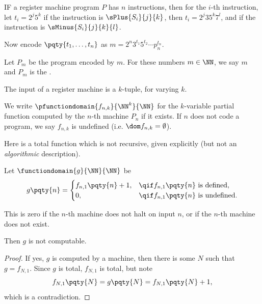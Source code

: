 \begin{definition}
    \label{def:encoding-register-machines}%
    IF a register machine program \(P\) has \(n\) instructions, then for the \(i\)-th instruction, let \(t_i = 2^j 5^k\) if the instruction is \(\sPlus{S_i}{j}{k}\), then \(t_i = 2^j 3 5^k 7^l\), and if the instruction is \(\sMinus{S_i}{j}{k}{l}\).

    Now encode \(\pqty{t_1, \ldots, t_n}\) as \(m = 2^n 3^{t_1} 5^{t_2} \cdots p_n^{t_n}\).
    
    Let \(P_m\) be the program encoded by \(m\). For these numbers \(m \in \NN\), we say \(m\)  and \(P_m\) is the .
\end{definition}

The input of a register machine is a \(k\)-tuple, for varying \(k\).

\begin{definition}
    We write \(\pfunctiondomain{f_{n, k}}{\NN^k}{\NN}\) for the \(k\)-variable partial function computed by the \(n\)-th machine \(P_n\) if it exists. If \(n\) does not code a program, we say \(f_{n, k}\) is undefined (i.e. \(\dom f_{n, k} = \emptyset\)).
\end{definition}

Here is a total function which is not recursive, given explicitly (but not an \emph{algorithmic} description).

\begin{lemma}
    \label{lem:explicit-uncomputable-function}%
    Let \(\functiondomain{g}{\NN}{\NN}\) be
    \[
        g\pqty{n} = \begin{cases}
            f_{n, 1} \pqty{n} + 1, & \qif f_{n, 1} \pqty{n} \text{ is defined}, \\
            0, & \qif f_{n, 1} \pqty{n} \text{ is undefined}.
        \end{cases}
    \]

    This is zero if the \(n\)-th machine does not halt on input \(n\), or if the \(n\)-th machine does not exist.

    Then \(g\) is not computable.
\end{lemma}

\begin{proof}
    If yes, \(g\) is computed by a machine, then there is some \(N\) such that \(g = f_{N, 1}\). Since \(g\) is total, \(f_{N, 1}\) is total, but note
    \[
        f_{N, 1} \pqty{N} = g\pqty{N} = f_{N, 1} \pqty{N} + 1,
    \]
    which is a contradiction.
\end{proof}

